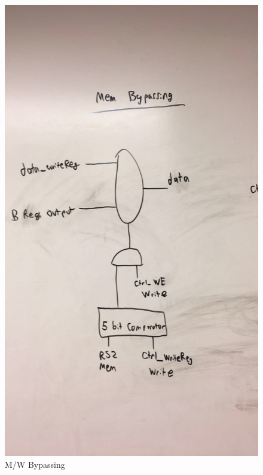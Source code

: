 \documentclass[letterpaper]{article} %
\begin{document}
  \begin{figure}[!htb]
        \includegraphics[scale=.45]{MemBypassing.jpg}
        \caption{M/W Bypassing}
        \label{fig:2}
    \end{figure}
    
       \FloatBarrier
    
\end{document}
